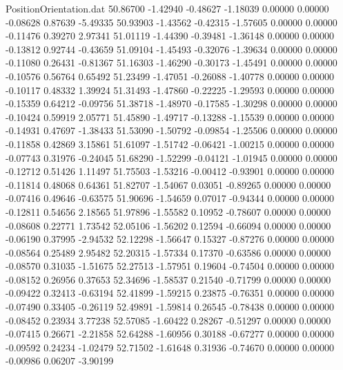 \begin{filecontents}{PositionOrientation.dat}
  50.86700   -1.42940   -0.48627    -1.18039    0.00000    0.00000   -0.08628    0.87639   -5.49335
  50.93903   -1.43562   -0.42315    -1.57605    0.00000    0.00000   -0.11476    0.39270    2.97341
  51.01119   -1.44390   -0.39481    -1.36148    0.00000    0.00000   -0.13812    0.92744   -0.43659
  51.09104   -1.45493   -0.32076    -1.39634    0.00000    0.00000   -0.11080    0.26431   -0.81367
  51.16303   -1.46290   -0.30173    -1.45491    0.00000    0.00000   -0.10576    0.56764    0.65492
  51.23499   -1.47051   -0.26088    -1.40778    0.00000    0.00000   -0.10117    0.48332    1.39924
  51.31493   -1.47860   -0.22225    -1.29593    0.00000    0.00000   -0.15359    0.64212   -0.09756
  51.38718   -1.48970   -0.17585    -1.30298    0.00000    0.00000   -0.10424    0.59919    2.05771
  51.45890   -1.49717   -0.13288    -1.15539    0.00000    0.00000   -0.14931    0.47697   -1.38433
  51.53090   -1.50792   -0.09854    -1.25506    0.00000    0.00000   -0.11858    0.42869    3.15861
  51.61097   -1.51742   -0.06421    -1.00215    0.00000    0.00000   -0.07743    0.31976   -0.24045
  51.68290   -1.52299   -0.04121    -1.01945    0.00000    0.00000   -0.12712    0.51426    1.11497
  51.75503   -1.53216   -0.00412    -0.93901    0.00000    0.00000   -0.11814    0.48068    0.64361
  51.82707   -1.54067    0.03051    -0.89265    0.00000    0.00000   -0.07416    0.49646   -0.63575
  51.90696   -1.54659    0.07017    -0.94344    0.00000    0.00000   -0.12811    0.54656    2.18565
  51.97896   -1.55582    0.10952    -0.78607    0.00000    0.00000   -0.08608    0.22771    1.73542
  52.05106   -1.56202    0.12594    -0.66094    0.00000    0.00000   -0.06190    0.37995   -2.94532
  52.12298   -1.56647    0.15327    -0.87276    0.00000    0.00000   -0.08564    0.25489    2.95482
  52.20315   -1.57334    0.17370    -0.63586    0.00000    0.00000   -0.08570    0.31035   -1.51675
  52.27513   -1.57951    0.19604    -0.74504    0.00000    0.00000   -0.08152    0.26956    0.37653
  52.34696   -1.58537    0.21540    -0.71799    0.00000    0.00000   -0.09422    0.32413   -0.63194
  52.41899   -1.59215    0.23875    -0.76351    0.00000    0.00000   -0.07490    0.33405   -0.26119
  52.49891   -1.59814    0.26545    -0.78438    0.00000    0.00000   -0.08452    0.23934    3.77238
  52.57085   -1.60422    0.28267    -0.51297    0.00000    0.00000   -0.07415    0.26671   -2.21858
  52.64288   -1.60956    0.30188    -0.67277    0.00000    0.00000   -0.09592    0.24234   -1.02479
  52.71502   -1.61648    0.31936    -0.74670    0.00000    0.00000   -0.00986    0.06207   -3.90199

\end{filecontents}
